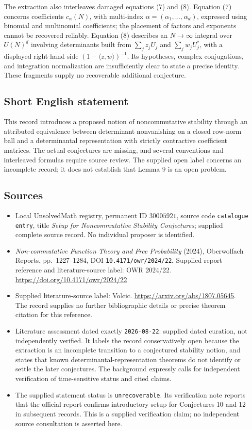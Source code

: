 \documentclass[11pt]{article}
\begin{document}
The extraction also interleaves damaged equations (7) and (8). Equation (7) concerns coefficients \(c_\alpha(N)\), with multi-index \(\alpha=(\alpha_1,\ldots,\alpha_d)\), expressed using binomial and multinomial coefficients; the placement of factors and exponents cannot be recovered reliably. Equation (8) describes an \(N\to\infty\) integral over \(U(N)^d\) involving determinants built from \(\sum_j z_jU_j\) and \(\sum_j w_jU_j^*\), with a displayed right-hand side \((1-\langle z,w\rangle)^{-1}\). Its hypotheses, complex conjugations, and integration normalization are insufficiently clear to state a precise identity. These fragments supply no recoverable additional conjecture.
\subsection{Short English statement}
This record introduces a proposed notion of noncommutative stability through an attributed equivalence between determinant nonvanishing on a closed row-norm ball and a determinantal representation with strictly contractive coefficient matrices. The actual conjectures are missing, and several conventions and interleaved formulas require source review. The supplied open label concerns an incomplete record; it does not establish that Lemma 9 is an open problem.
\subsection{Sources}
\begin{itemize}
\item Local UnsolvedMath registry, permanent ID \(30005921\), source code \texttt{catalogue entry}, title \emph{Setup for Noncommutative Stability Conjectures}; supplied complete source record. No individual proposer is identified.
\item \emph{Non-commutative Function Theory and Free Probability} (2024), Oberwolfach Reports, pp.\ 1227--1284, DOI \texttt{10.4171/owr/2024/22}. Supplied report reference and literature-source label: OWR 2024/22. \url{https://doi.org/10.4171/owr/2024/22}
\item Supplied literature-source label: Volcic. \url{https://arxiv.org/abs/1807.05645}. The record supplies no further bibliographic details or precise theorem citation for this reference.
\item Literature assessment dated exactly \texttt{2026-08-22}: supplied dated curation, not independently verified. It labels the record conservatively open because the extraction is an incomplete transition to a conjectured stability notion, and states that known determinantal-representation theorems do not identify or settle the later conjectures. The background expressly calls for independent verification of time-sensitive status and cited claims.
\item The supplied statement status is \texttt{unrecoverable}. Its verification note reports that the official report confirms introductory setup for Conjectures 10 and 12 in subsequent records. This is a supplied verification claim; no independent source consultation is asserted here.
\end{itemize}
\end{document}
